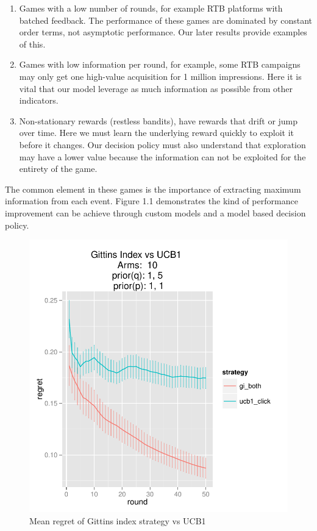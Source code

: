 \documentclass[11pt,a4,singlespacing,titlepagenumber=on]{scrreprt}
\numberwithin{equation}{chapter} %
\theoremstyle{remark}
\begin{document}
\begin{enumerate}
	\item Games with a low number of rounds, for example RTB platforms with batched feedback. The performance of these games are dominated by constant order terms, not asymptotic performance. Our later results provide examples of this. 
	\item Games with low information per round, for example, some RTB campaigns may only get one high-value acquisition for 1 million impressions. Here it is vital that our model leverage as much information as possible from other indicators.
	\item Non-stationary rewards (restless bandits), have rewards that drift or jump over time. Here we must learn the underlying reward quickly to exploit it before it changes. Our decision policy must also understand that exploration may have a lower value because the information can not be exploited for the entirety of the game.
\end{enumerate}

The common element in these games is the importance of extracting maximum information from each event. Figure 1.1 demonstrates the kind of performance improvement can be achieve through custom models and a model based decision policy.

\begin{figure}[p]
    \centering
    \includegraphics[scale=0.7]{GIvsUCB1.pdf}
    \caption{Mean regret of Gittins index strategy vs UCB1}
    \label{fig:GIvsUCB1}
\end{figure}
\end{document}
